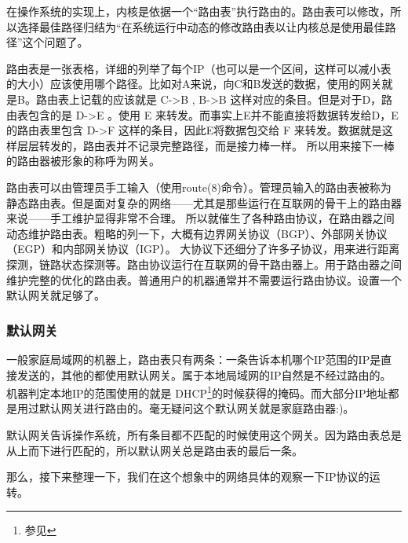 在操作系统的实现上，内核是依据一个“路由表”执行路由的。路由表可以修改，所以选择最佳路径归结为“在系统运行中动态的修改路由表以让内核总是使用最佳路径”这个问题了。

路由表是一张表格，详细的列举了每个IP（也可以是一个区间，这样可以减小表的大小）应该使用哪个路径。比如对A来说，向C和B发送的数据，使用的网关就是B。路由表上记载的应该就是 C->B , B->B 这样对应的条目。但是对于D，路由表包含的是 D->E 。使用 E 来转发。而事实上E并不能直接将数据转发给D，E 的路由表里包含 D->F 这样的条目，因此E将数据包交给 F 来转发。数据就是这样层层转发的，路由表并不记录完整路径，而是接力棒一样。
所以用来接下一棒的路由器被形象的称呼为网关。

路由表可以由管理员手工输入（使用route(8)命令）。管理员输入的路由表被称为静态路由表。但是面对复杂的网络——尤其是那些运行在互联网的骨干上的路由器来说——手工维护显得非常不合理。
所以就催生了各种路由协议，在路由器之间动态维护路由表。粗略的列一下，大概有边界网关协议（BGP）、外部网关协议（EGP）和内部网关协议（IGP）。
大协议下还细分了许多子协议，用来进行距离探测，链路状态探测等。路由协议运行在互联网的骨干路由器上。用于路由器之间维护完整的优化的路由表。普通用户的机器通常并不需要运行路由协议。设置一个默认网关就足够了。

\begin{insertnote}
\subsubsection{默认网关}

一般家庭局域网的机器上，路由表只有两条：一条告诉本机哪个IP范围的IP是直接发送的，其他的都使用默认网关。属于本地局域网的IP自然是不经过路由的。机器判定本地IP的范围使用的就是
DHCP\footnote{参见}的时候获得的掩码。而大部分IP地址都是用过默认网关进行路由的。毫无疑问这个默认网关就是家庭路由器:)。

默认网关告诉操作系统，所有条目都不匹配的时候使用这个网关。因为路由表总是从上而下进行匹配的，所以默认网关总是路由表的最后一条。

\end{insertnote}

那么，接下来整理一下，我们在这个想象中的网络具体的观察一下IP协议的运转。

